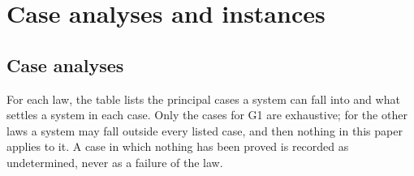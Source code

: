 \section{Case analyses and instances}
\label{supp:laws}

\subsection{Case analyses}

For each law, the table lists the principal cases a system can fall into and what settles a system
in each case. Only the cases for G1 are exhaustive; for the other laws a system may fall outside
every listed case, and then nothing in this paper applies to it. A case in which nothing has been proved is recorded as
undetermined, never as a failure of the law.


